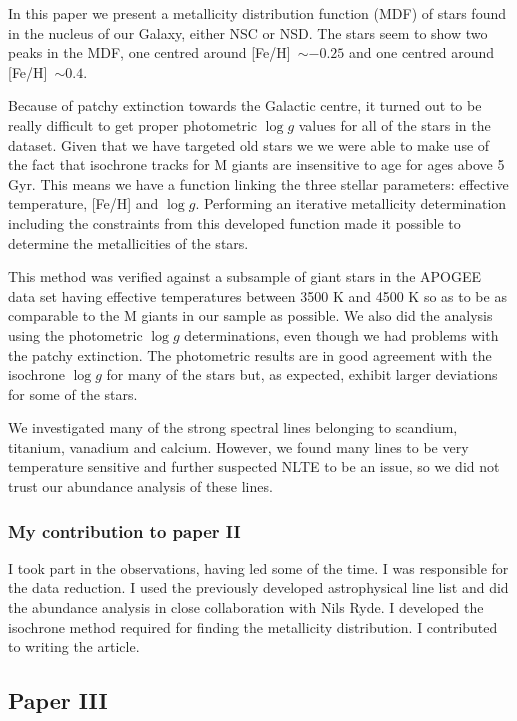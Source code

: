 In this paper we present a metallicity distribution function (MDF) of stars found in the nucleus of our Galaxy, either NSC or NSD. The stars seem to show two peaks in the MDF, one centred around [Fe/H]~$\sim -0.25$ and one centred around [Fe/H]~$\sim 0.4$.

Because of patchy extinction towards the Galactic centre, it turned out to be really difficult to get proper photometric $\log g$ values for all of the stars in the dataset. Given that we have targeted old stars we we were able to make use of the fact that isochrone tracks for M giants are insensitive to age for ages above 5\,Gyr. This means we have a function linking the three stellar parameters: effective temperature, [Fe/H] and $\log g$. Performing an iterative metallicity determination including the constraints from this developed function made it possible to determine the metallicities of the stars.

This method was verified against a subsample of giant stars in the APOGEE data set having effective temperatures between 3500 K and 4500 K so as to be as comparable to the M giants in our sample as possible. We also did the analysis using the photometric $\log g$ determinations, even though we had problems with the patchy extinction. The photometric results are in good agreement with the isochrone $\log g$ for many of the stars but, as expected, exhibit larger deviations for some of the stars.

We investigated many of the strong spectral lines belonging to scandium, titanium, vanadium and calcium. However, we found many lines to be very temperature sensitive and further suspected NLTE to be an issue, so we did not trust our abundance analysis of these lines.

\subsubsection*{My contribution to paper II}

I took part in the observations, having led some of the time. I was responsible for the data reduction. I used the previously developed astrophysical line list and did the abundance analysis in close collaboration with Nils Ryde. I developed the isochrone method required for finding the metallicity distribution. I contributed to writing the article.


\subsection*{Paper III}

